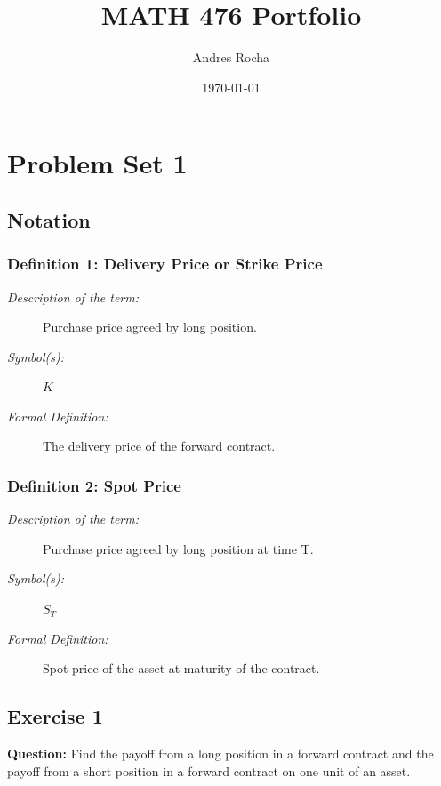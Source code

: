\documentclass{article}
\title{MATH 476 Portfolio}
\author{Andres Rocha}
\date{\today}
\begin{document}
\maketitle

\section{Problem Set 1}


\subsection{Notation}

\subsubsection{Definition 1: Delivery Price or Strike Price}
\begin{description}
    \item[\textit{Description of the term:}] Purchase price agreed by long position.
    \item[\textit{Symbol(s):}] $K$
    \item[\textit{Formal Definition:}] The delivery price of the forward contract.
\end{description}


\subsubsection{Definition 2: Spot Price}

\begin{description}
    \item[\textit{Description of the term:}] Purchase price agreed by long position at time T.
    \item[\textit{Symbol(s):}] $S_T$
    \item[\textit{Formal Definition:}] Spot price of the asset at maturity of the contract.
\end{description}


\subsection*{Exercise 1}

\textbf{Question:} Find the payoff from a long position in a forward contract and the payoff from a short position in a forward contract on one unit of an asset.
\end{document}
